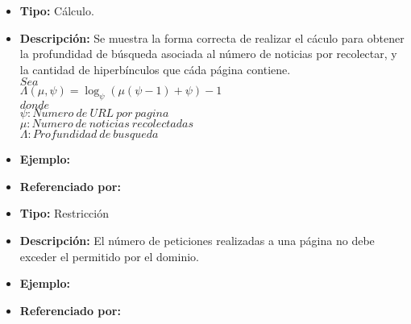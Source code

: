 \begin{itemize}
  \item \textbf{Tipo:} Cálculo.
  \item \textbf{Descripción:} Se muestra la forma correcta de realizar el cáculo para obtener la profundidad de búsqueda asociada al número de noticias por recolectar, y la cantidad de hiperbínculos que cáda página contiene.\\
 
  $Sea$\\

  $\Lambda(\mu,\psi)=\log_{\psi}{(\mu(\psi-1)+\psi)}-1$\\

  $donde$\\
  $\psi:Numero\ de\ URL\ por\ pagina$\\
  $\mu:Numero\ de\ noticias\ recolectadas$\\
  $\Lambda:Profundidad\ de\ busqueda$\\



  \item \textbf{Ejemplo:} 
  \item \textbf{Referenciado por:} \\
\end{itemize}


\begin{itemize}
  \item \textbf{Tipo:} Restricción
  \item \textbf{Descripción:} El número de peticiones realizadas a una página no debe exceder el permitido por el dominio.
  \item \textbf{Ejemplo:} 
  \item \textbf{Referenciado por:}  \\
\end{itemize}

